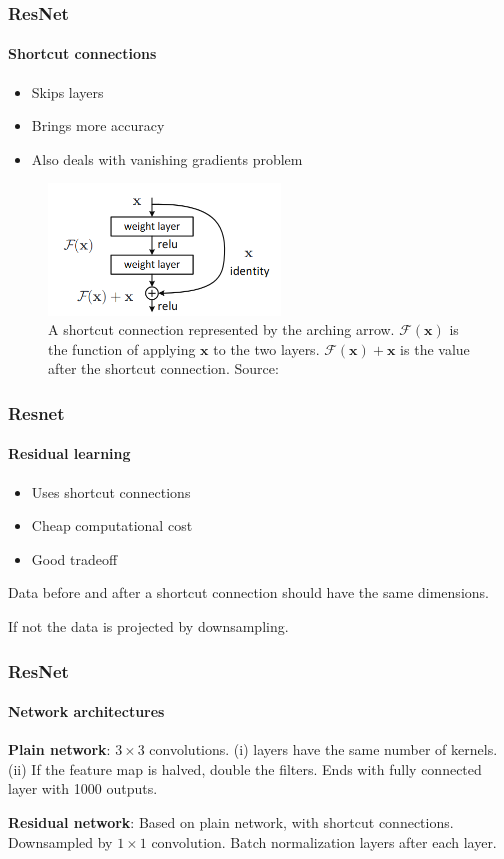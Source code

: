 \documentclass{beamer}
\begin{document}
\begin{frame}
    \frametitle{ResNet}
    \framesubtitle{Shortcut connections}

    \begin{itemize}
        \item Skips layers
        \item Brings more accuracy
        \item Also deals with vanishing gradients problem
    \end{itemize}

    \begin{figure}
        \centering
        \includegraphics[width=0.55\textwidth]{../assets/shortcut-connection.png}
        \caption{A shortcut connection represented by the arching arrow. $\mathcal{F}(\bm{x})$ is the function of applying $\bm{x}$ to the two layers. $\mathcal{F}(\bm{x}) + \bm{x}$ is the value after the shortcut connection. Source: \cite{resnet}}
        \label{fig:shortcut_connection}
    \end{figure}
\end{frame}

\begin{frame}
    \frametitle{Resnet}
    \framesubtitle{Residual learning}
    
    \begin{itemize}
        \item Uses shortcut connections
        \item Cheap computational cost
        \item Good tradeoff
    \end{itemize}

    \pause

    Data before and after a shortcut connection should have the same dimensions.
    \pause

    If not the data is projected by downsampling.
\end{frame}

\begin{frame}
    \frametitle{ResNet}
    \framesubtitle{Network architectures}
    \textbf{Plain network}: $3 \times 3$ convolutions. \pause (i) layers have the same number of kernels. \pause (ii) If the feature map is halved, double the filters. \pause
    Ends with fully connected layer with 1000 outputs.

    \pause

    \textbf{Residual network}: Based on plain network, with shortcut connections. Downsampled by $1 \times 1$ convolution.
    \pause
    Batch normalization layers after each layer.
\end{frame}
\end{document}
